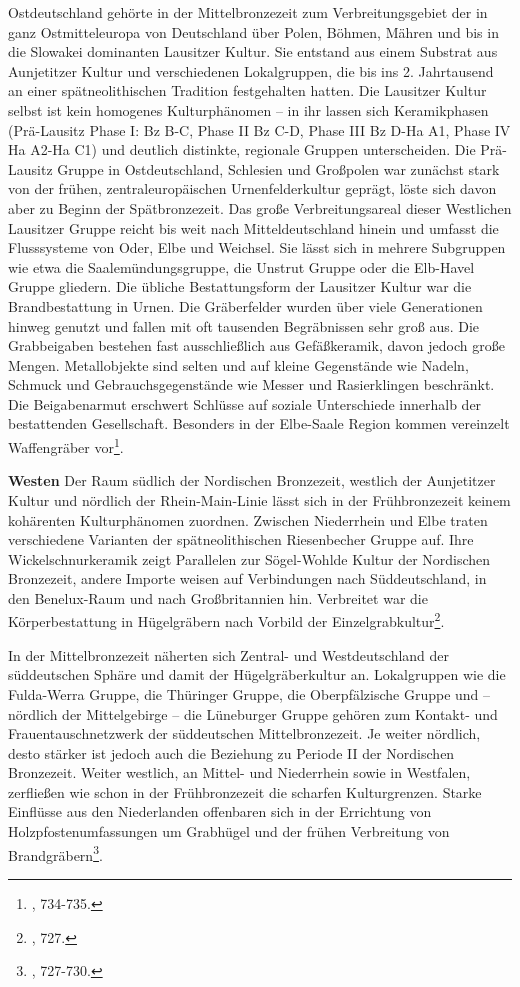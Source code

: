 \documentclass[openany,twoside,twocolumn]{book}
\let\rmarkdownfootnote\footnote%
\def\footnote{\protect\rmarkdownfootnote}
\begin{document}
Ostdeutschland gehörte in der Mittelbronzezeit zum Verbreitungsgebiet der in ganz Ostmitteleuropa von Deutschland über Polen, Böhmen, Mähren und bis in die Slowakei dominanten Lausitzer Kultur. Sie entstand aus einem Substrat aus Aunjetitzer Kultur und verschiedenen Lokalgruppen, die bis ins 2. Jahrtausend an einer spätneolithischen Tradition festgehalten hatten. Die Lausitzer Kultur selbst ist kein homogenes Kulturphänomen -- in ihr lassen sich Keramikphasen (Prä-Lausitz Phase I: Bz B-C, Phase II Bz C-D, Phase III Bz D-Ha A1, Phase IV Ha A2-Ha C1) und deutlich distinkte, regionale Gruppen unterscheiden. Die Prä-Lausitz Gruppe in Ostdeutschland, Schlesien und Großpolen war zunächst stark von der frühen, zentraleuropäischen Urnenfelderkultur geprägt, löste sich davon aber zu Beginn der Spätbronzezeit. Das große Verbreitungsareal dieser Westlichen Lausitzer Gruppe reicht bis weit nach Mitteldeutschland hinein und umfasst die Flusssysteme von Oder, Elbe und Weichsel. Sie lässt sich in mehrere Subgruppen wie etwa die Saalemündungsgruppe, die Unstrut Gruppe oder die Elb-Havel Gruppe gliedern. Die übliche Bestattungsform der Lausitzer Kultur war die Brandbestattung in Urnen. Die Gräberfelder wurden über viele Generationen hinweg genutzt und fallen mit oft tausenden Begräbnissen sehr groß aus. Die Grabbeigaben bestehen fast ausschließlich aus Gefäßkeramik, davon jedoch große Mengen. Metallobjekte sind selten und auf kleine Gegenstände wie Nadeln, Schmuck und Gebrauchsgegenstände wie Messer und Rasierklingen beschränkt. Die Beigabenarmut erschwert Schlüsse auf soziale Unterschiede innerhalb der bestattenden Gesellschaft. Besonders in der Elbe-Saale Region kommen vereinzelt Waffengräber vor\footnote{\textcite{jockenhovel_germany_2013}, 734-735.}.

\textbf{Westen} \newline 
Der Raum südlich der Nordischen Bronzezeit, westlich der Aunjetitzer Kultur und nördlich der Rhein-Main-Linie lässt sich in der Frühbronzezeit keinem kohärenten Kulturphänomen zuordnen. Zwischen Niederrhein und Elbe traten verschiedene Varianten der spätneolithischen Riesenbecher Gruppe auf. Ihre Wickelschnurkeramik zeigt Parallelen zur Sögel-Wohlde Kultur der Nordischen Bronzezeit, andere Importe weisen auf Verbindungen nach Süddeutschland, in den Benelux-Raum und nach Großbritannien hin. Verbreitet war die Körperbestattung in Hügelgräbern nach Vorbild der Einzelgrabkultur\footnote{\textcite{jockenhovel_germany_2013}, 727.}.

In der Mittelbronzezeit näherten sich Zentral- und Westdeutschland der süddeutschen Sphäre und damit der Hügelgräberkultur an. Lokalgruppen wie die Fulda-Werra Gruppe, die Thüringer Gruppe, die Oberpfälzische Gruppe und -- nördlich der Mittelgebirge -- die Lüneburger Gruppe gehören zum Kontakt- und Frauentauschnetzwerk der süddeutschen Mittelbronzezeit. Je weiter nördlich, desto stärker ist jedoch auch die Beziehung zu Periode II der Nordischen Bronzezeit. Weiter westlich, an Mittel- und Niederrhein sowie in Westfalen, zerfließen wie schon in der Frühbronzezeit die scharfen Kulturgrenzen. Starke Einflüsse aus den Niederlanden offenbaren sich in der Errichtung von Holzpfostenumfassungen um Grabhügel und der frühen Verbreitung von Brandgräbern\footnote{\textcite{jockenhovel_germany_2013}, 727-730.}.
\end{document}
